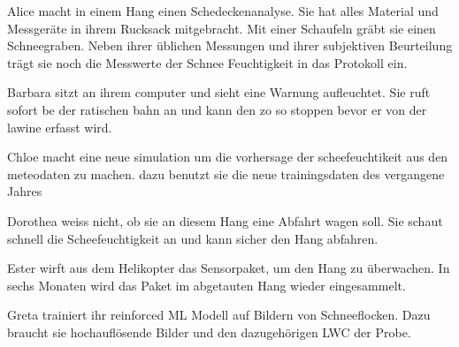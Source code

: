 \label{userstoryvoll}

Alice macht in einem Hang einen Schedeckenanalyse. Sie hat alles Material und Messgeräte in ihrem Rucksack mitgebracht. Mit einer Schaufeln gräbt sie einen Schneegraben. Neben ihrer üblichen Messungen und ihrer subjektiven Beurteilung trägt sie noch die Messwerte der Schnee Feuchtigkeit in das Protokoll ein.

Barbara sitzt an ihrem computer und sieht eine Warnung aufleuchtet. Sie ruft  sofort be der ratischen bahn an und kann den zo so stoppen bevor er von der lawine erfasst wird.

Chloe macht eine neue simulation um die vorhersage der scheefeuchtikeit aus den meteodaten zu machen. dazu benutzt sie die neue trainingsdaten des vergangene Jahres 

Dorothea weiss nicht, ob sie an diesem Hang eine Abfahrt wagen soll. Sie schaut schnell die Scheefeuchtigkeit an und kann sicher den Hang abfahren.

Ester wirft aus dem Helikopter das Sensorpaket, um den Hang zu überwachen. In sechs Monaten wird das Paket im abgetauten Hang wieder eingesammelt.

Greta trainiert ihr reinforced ML Modell auf Bildern von Schneeflocken. Dazu braucht sie hochauflösende Bilder und den dazugehörigen LWC der Probe.

